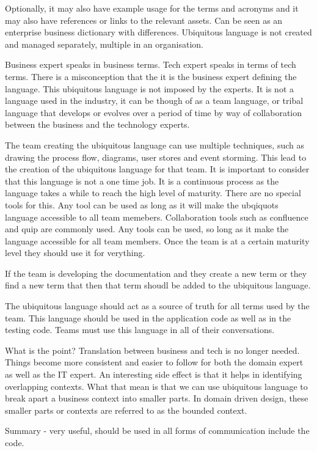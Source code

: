 Optionally, it may also have example usage for the terms and acronyms and it may also have references or links to the relevant assets.
Can be seen as an enterprise business dictionary with differences.
Ubiquitous language is not created and managed separately, multiple in an organisation.

Business expert speaks in business terms.
Tech expert speaks in terms of tech terms.
There is a misconception that the it is the business expert defining the language.
This ubiquitous language is not imposed by the experts.
It is not a language used in the industry, it can be though of as a team language, or tribal language that develops or evolves over a period of time by way of collaboration between the business and the technology experts.

The team creating the ubiquitous language can use multiple techniques, such as drawing the process flow, diagrams, user stores and event storming.
This lead to the creation of the ubiquitous language for that team.
It is important to consider that this language is not a one time job.
It is a continuous process as the language takes a while to reach the high level of maturity.
There are no special tools for this.
Any tool can be used as long as it will make the ubqiquots language accessible to all team memebers.
Collaboration tools such as confluence and quip are commonly used.
Any tools can be used, so long as it make the language accessible for all team members. Once the team is at a certain maturity level they should use it for verything.

If the team is developing the documentation and they create a new term or they find a new term that then that term shoudl be added to the ubiquitous language.

The ubiquitous language should act as a source of truth for all terms used by the team.
This language should be used in the application code as well as in the testing code.
Teams must use this language in all of their conversations.

What is the point?
Translation between business and tech is no longer needed.
Things become more consistent and easier to follow for both the domain expert as well as the IT expert.
An interesting side effect is that it helps in identifying overlapping contexts.
What that mean is that we can use ubiquitous language to break apart a business context into smaller parts.
In domain driven design, these smaller parts or contexts are referred to as the bounded context.

Summary - very useful, should be used in all forms of communication include the code.


